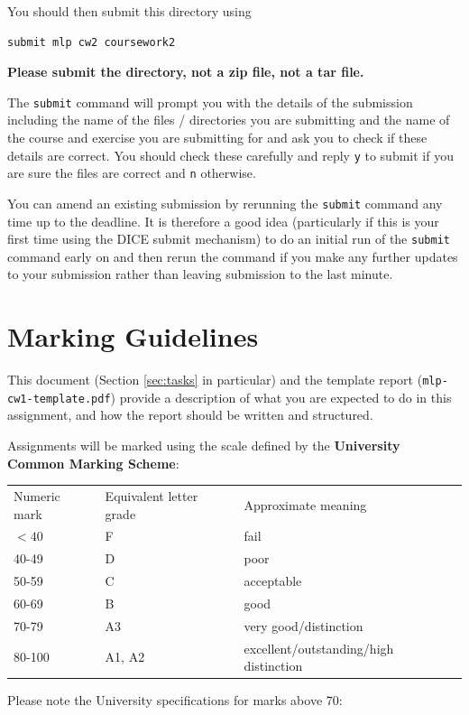 \documentclass[11pt,]{article}
\begin{document}
You should then submit this directory using

\begin{verbatim}
submit mlp cw2 coursework2
\end{verbatim}

\textbf{Please submit the directory, not a zip file, not a tar file.}

The \texttt{submit} command will prompt you with the details of the
submission including the name of the files / directories you are
submitting and the name of the course and exercise you are submitting
for and ask you to check if these details are correct. You should check
these carefully and reply \texttt{y} to submit if you are sure the files
are correct and \texttt{n} otherwise.

You can amend an existing submission by rerunning the \texttt{submit}
command any time up to the deadline. It is therefore a good idea
(particularly if this is your first time using the DICE submit
mechanism) to do an initial run of the \texttt{submit} command early on
and then rerun the command if you make any further updates to your
submission rather than leaving submission to the last minute.


\section{Marking Guidelines}
\label{sec:marking-scheme}
This document (Section \ref{sec:tasks} in particular) and the template report (\verb+mlp-cw1-template.pdf+) provide a description of what you are expected to do in this assignment, and how the report should be written and structured.

Assignments will be marked using the scale defined by the \textbf{University Common Marking Scheme}:
\begin{center}
\begin{tabular}{lll}
Numeric mark & Equivalent letter grade & Approximate meaning \\
$< 40$ & F & fail \\
40-49 & D & poor \\
50-59 & C & acceptable \\
60-69 & B & good \\
70-79 & A3 & very good/distinction \\
80-100 & A1, A2 & excellent/outstanding/high distinction
\end{tabular}
\end{center}

Please note the University specifications for marks above 70:
\end{document}
